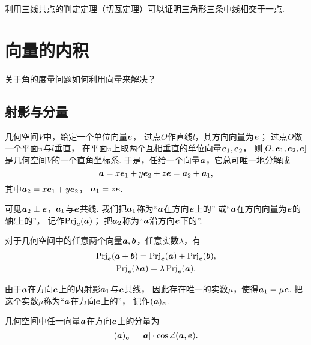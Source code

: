 利用三线共点的判定定理（切瓦定理）可以证明三角形三条中线相交于一点.

\section{向量的内积}
关于角的度量问题如何利用向量来解决？

\subsection{射影与分量}
几何空间\(V\)中，给定一个单位向量\(\boldsymbol{e}\)，
过点\(O\)作直线\(l\)，其方向向量为\(\boldsymbol{e}\)；
过点\(O\)做一个平面\(\pi\)与\(l\)垂直，
在平面\(\pi\)上取两个互相垂直的单位向量\(\boldsymbol{e}_1,\boldsymbol{e}_2\)，
则\([O;\boldsymbol{e}_1,\boldsymbol{e}_2,\boldsymbol{e}]\)是几何空间\(V\)的一个直角坐标系.
于是，任给一个向量\(\boldsymbol{a}\)，它总可唯一地分解成\[
	\boldsymbol{a}
	= x \boldsymbol{e}_1 + y \boldsymbol{e}_2 + z \boldsymbol{e}
	= \boldsymbol{a}_2 + \boldsymbol{a}_1,
\]
其中\(\boldsymbol{a}_2 = x \boldsymbol{e}_1 + y \boldsymbol{e}_2\)，
\(\boldsymbol{a}_1 = z \boldsymbol{e}\).

可见\(\boldsymbol{a}_2 \perp \boldsymbol{e}\)，\(\boldsymbol{a}_1\)与\(\boldsymbol{e}\)共线.
我们把\(\boldsymbol{a}_1\)称为“\(\boldsymbol{a}\)在方向\(\boldsymbol{e}\)上的”
或“\(\boldsymbol{a}\)在方向向量为\(\boldsymbol{e}\)的轴\(l\)上的”，
记作\(\operatorname{Prj}_{\boldsymbol{e}}(\boldsymbol{a})\)；
把\(\boldsymbol{a}_2\)称为“\(\boldsymbol{a}\)沿方向\(\boldsymbol{e}\)下的”.

\begin{theorem}
对于几何空间中的任意两个向量\(\boldsymbol{a},\boldsymbol{b}\)，任意实数\(\lambda\)，有\begin{gather}
	\operatorname{Prj}_{\boldsymbol{e}}(\boldsymbol{a}+\boldsymbol{b})
	= \operatorname{Prj}_{\boldsymbol{e}}(\boldsymbol{a})
	+ \operatorname{Prj}_{\boldsymbol{e}}(\boldsymbol{b}), \\
	\operatorname{Prj}_{\boldsymbol{e}}(\lambda \boldsymbol{a})
	= \lambda \operatorname{Prj}_{\boldsymbol{e}}(\boldsymbol{a}).
\end{gather}
\end{theorem}

由于\(\boldsymbol{a}\)在方向\(\boldsymbol{e}\)上的内射影\(\boldsymbol{a}_1\)与\(\boldsymbol{e}\)共线，
因此存在唯一的实数\(\mu\)，使得\(\boldsymbol{a}_1 = \mu \boldsymbol{e}\).
把这个实数\(\mu\)称为“\(\boldsymbol{a}\)在方向\(\boldsymbol{e}\)上的”，
记作\((\boldsymbol{a})_{\boldsymbol{e}}\).

\begin{theorem}
几何空间中任一向量\(\boldsymbol{a}\)在方向\(\boldsymbol{e}\)上的分量为\begin{equation}
	(\boldsymbol{a})_{\boldsymbol{e}}
	= \abs{\boldsymbol{a}} \cdot \cos\angle(\boldsymbol{a},\boldsymbol{e}).
\end{equation}
\end{theorem}


